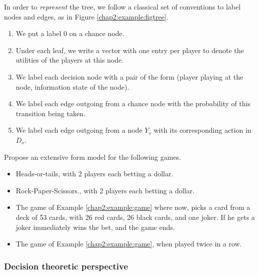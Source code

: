 \begin{notation}
In order to \emph{represent} the tree, we follow a classical set of conventions to label nodes and edges,  as in Figure \ref{chap2:example:figtree}.
\begin{enumerate}
\item We put a label $0$ on a chance node.
\item Under each leaf, we write a vector with one entry per player to denote the utilities of the players at this node.
\item We label each decision node with a pair of the form (player playing at the node, information state of the node).
\item We label each edge outgoing from a chance node with the probability of this transition being taken.
\item We label each edge outgoing from a node $Y_s$ with its corresponding action in $D_s$.
\end{enumerate}
\end{notation}



\begin{exercise}
Propose an extensive form model for the following games.
\begin{itemize}
\item Heads-or-tails, with 2 players each betting a dollar.
\item Rock-Paper-Scissors., with 2 players each betting a dollar.
\item The game of Example \ref{chap2:example:game} where now, \TAtwo{} picks a card from a deck of 53 cards, with 26 red cards, 26 black cards, and one joker. If he gets a joker \TAone{} immediately wins the bet, and the game ends.
\item The game of Example \ref{chap2:example:game}, when played twice in a row.
\end{itemize}
\end{exercise}


\subsubsection{Decision theoretic perspective}

